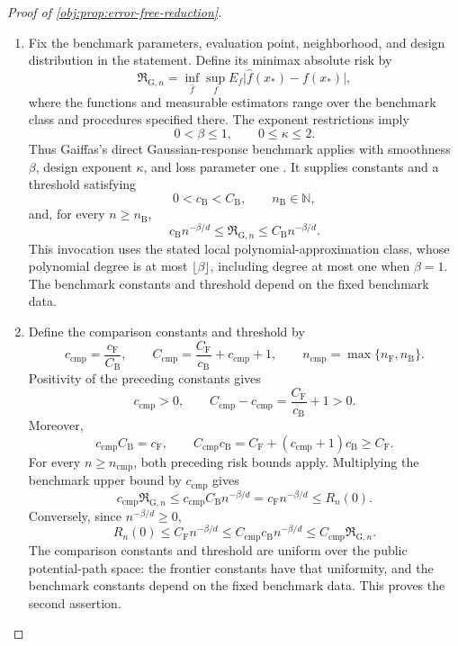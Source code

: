 \documentclass[11pt]{article}
\begin{document}
\begin{proof}[Proof of \cref{obj:prop:error-free-reduction}]
\begin{enumerate}
\item Fix the benchmark parameters, evaluation point, neighborhood, and design distribution in the statement. Define its minimax absolute risk by
\[
\mathfrak R_{\mathrm G,n}
=
\inf_{\widehat f}\sup_f
E_f\bigl|\widehat f(x_*)-f(x_*)\bigr|,
\]
where the functions and measurable estimators range over the benchmark class and procedures specified there. The exponent restrictions imply
\[
0<\beta\le1,
\qquad 0\le\kappa\le2.
\]
Thus Gaiffas's direct Gaussian-response benchmark applies with smoothness \(\beta\), design exponent \(\kappa\), and loss parameter one \citep[Definition 2 and Theorem 1, equations (2.1), (2.4), and (2.5), pp.~3--4]{Gaiffas2005}. It supplies constants and a threshold satisfying
\[
0<c_{\mathrm B}<C_{\mathrm B},
\qquad n_{\mathrm B}\in\mathbb N,
\]
and, for every \(n\ge n_{\mathrm B}\),
\[
c_{\mathrm B}n^{-\beta/d}
\le \mathfrak R_{\mathrm G,n}
\le C_{\mathrm B}n^{-\beta/d}.
\]
This invocation uses the stated local polynomial-approximation class, whose polynomial degree is at most \(\lfloor\beta\rfloor\), including degree at most one when \(\beta=1\). The benchmark constants and threshold depend on the fixed benchmark data.

\item Define the comparison constants and threshold by
\[
c_{\mathrm{cmp}}=\frac{c_{\mathrm F}}{C_{\mathrm B}},
\qquad
C_{\mathrm{cmp}}
=\frac{C_{\mathrm F}}{c_{\mathrm B}}+c_{\mathrm{cmp}}+1,
\qquad
n_{\mathrm{cmp}}=\max\{n_{\mathrm F},n_{\mathrm B}\}.
\]
Positivity of the preceding constants gives
\[
c_{\mathrm{cmp}}>0,
\qquad
C_{\mathrm{cmp}}-c_{\mathrm{cmp}}
=\frac{C_{\mathrm F}}{c_{\mathrm B}}+1>0.
\]
Moreover,
\[
c_{\mathrm{cmp}}C_{\mathrm B}=c_{\mathrm F},
\qquad
C_{\mathrm{cmp}}c_{\mathrm B}
=C_{\mathrm F}+(c_{\mathrm{cmp}}+1)c_{\mathrm B}
\ge C_{\mathrm F}.
\]
For every \(n\ge n_{\mathrm{cmp}}\), both preceding risk bounds apply. Multiplying the benchmark upper bound by \(c_{\mathrm{cmp}}\) gives
\[
c_{\mathrm{cmp}}\mathfrak R_{\mathrm G,n}
\le c_{\mathrm{cmp}}C_{\mathrm B}n^{-\beta/d}
=c_{\mathrm F}n^{-\beta/d}
\le R_n(0).
\]
Conversely, since \(n^{-\beta/d}\ge0\),
\[
R_n(0)
\le C_{\mathrm F}n^{-\beta/d}
\le C_{\mathrm{cmp}}c_{\mathrm B}n^{-\beta/d}
\le C_{\mathrm{cmp}}\mathfrak R_{\mathrm G,n}.
\]
The comparison constants and threshold are uniform over the public potential-path space: the frontier constants have that uniformity, and the benchmark constants depend on the fixed benchmark data. This proves the second assertion.
\end{enumerate}
\end{proof}
\end{document}
